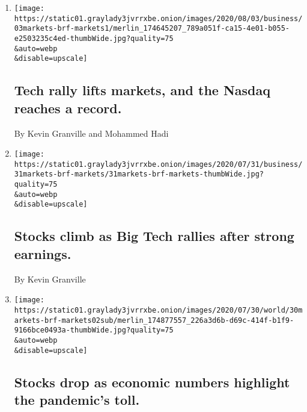 \begin{enumerate}
\def\labelenumi{\arabic{enumi}.}
\item
  \href{/live/2020/08/03/business/stock-market-today-coronavirus/tech-rally-lifts-markets-and-the-nasdaq-reaches-a-record}{}

  \texttt{[image: https://static01.graylady3jvrrxbe.onion/images/2020/08/03/business/03markets-brf-markets1/merlin\_174645207\_789a051f-ca15-4e01-b055-e2503235c4ed-thumbWide.jpg?quality=75\\\&auto=webp\\\&disable=upscale]}

  \hypertarget{tech-rally-lifts-markets-and-the-nasdaq-reaches-a-record}{%
  \subsection{Tech rally lifts markets, and the Nasdaq reaches a
  record.}\label{tech-rally-lifts-markets-and-the-nasdaq-reaches-a-record}}

  By Kevin Granville and Mohammed Hadi
\item
  \href{/live/2020/07/31/business/stock-market-today-coronavirus/stocks-climb-as-big-tech-rallies-after-strong-earnings}{}

  \texttt{[image: https://static01.graylady3jvrrxbe.onion/images/2020/07/31/business/31markets-brf-markets/31markets-brf-markets-thumbWide.jpg?quality=75\\\&auto=webp\\\&disable=upscale]}

  \hypertarget{stocks-climb-as-big-tech-rallies-after-strong-earnings}{%
  \subsection{Stocks climb as Big Tech rallies after strong
  earnings.}\label{stocks-climb-as-big-tech-rallies-after-strong-earnings}}

  By Kevin Granville
\item
  \href{/live/2020/07/30/business/stock-market-today-coronavirus/stocks-drop-as-economic-numbers-highlight-the-pandemics-toll}{}

  \texttt{[image: https://static01.graylady3jvrrxbe.onion/images/2020/07/30/world/30markets-brf-markets02sub/merlin\_174877557\_226a3d6b-d69c-414f-b1f9-9166bce0493a-thumbWide.jpg?quality=75\\\&auto=webp\\\&disable=upscale]}

  \hypertarget{stocks-drop-as-economic-numbers-highlight-the-pandemics-toll}{%
  \subsection{Stocks drop as economic numbers highlight the pandemic's
  toll.}\label{stocks-drop-as-economic-numbers-highlight-the-pandemics-toll}}


\end{enumerate}

